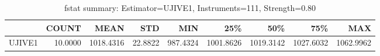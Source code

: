 \begin{table}[ht]
\centering
\caption{fstat summary: Estimator=UJIVE1, Instruments=111, Strength=0.80}
\begin{tabular}{lrrrrrrrr}
\toprule
 & COUNT & MEAN & STD & MIN & 25\% & 50\% & 75\% & MAX \\
\midrule
UJIVE1 & 10.0000 & 1018.4316 & 22.8822 & 987.4324 & 1001.8626 & 1019.3142 & 1027.6032 & 1062.9962 \\
\bottomrule
\end{tabular}
\end{table}
